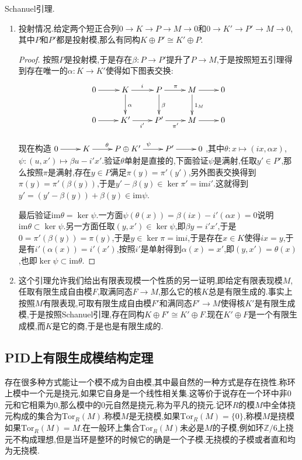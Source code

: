 Schanuel引理.
\begin{enumerate}
	\item 投射情况.给定两个短正合列$0\to K\to P\to M\to0$和$0\to K'\to P'\to M\to0$,其中$P$和$P'$都是投射模,那么有同构$K\oplus P'\cong K'\oplus P$.
	\begin{proof}
		
		按照$P$是投射模,于是存在$\beta:P\to P'$提升了$P\to M$,于是按照短五引理得到存在唯一的$\alpha:K\to K'$使得如下图表交换:
		$$\xymatrix{0\ar[r]&K\ar[r]^i\ar[d]^{\alpha}&P\ar[r]^{\pi}\ar[d]^{\beta}&M\ar[r]\ar[d]^{1_M}&0\\0\ar[r]&K'\ar[r]_{i'}&P'\ar[r]_{\pi'}&M\ar[r]&0}$$
		
		现在构造$\xymatrix{0\ar[r]&K\ar[r]^{\theta}&P\oplus K'\ar[r]^{\psi}&P'\ar[r]&0}$,其中$\theta:x\mapsto(ix,\alpha x)$,$\psi:(u,x')\mapsto\beta u-i'x'$.验证$\theta$单射是直接的,下面验证$\psi$是满射,任取$y'\in P'$,那么按照$\pi$是满射,存在$y\in P$满足$\pi(y)=\pi'(y')$,另外图表交换得到$\pi(y)=\pi'(\beta(y))$,于是$y'-\beta(y)\in\ker\pi'=\mathrm{im}i'$.这就得到$y'=(y'-\beta(y))+\beta(y)\in\mathrm{im}\psi$.
		
		最后验证$\mathrm{im}\theta=\ker\psi$.一方面$\psi(\theta(x))=\beta(ix)-i'(\alpha x)=0$说明$\mathrm{im}\theta\subset\ker\psi$.另一方面任取$(y,x')\in\ker\psi$,即$\beta y=i'x'$,于是$0=\pi'(\beta(y))=\pi(y)$,于是$y\in\ker\pi=\mathrm{im}i$,于是存在$x\in K$使得$ix=y$,于是有$i'(\alpha(x))=i'(x')$,按照$i'$是单射得到$\alpha(x)=x'$,即$(y,x')=\theta(x)$,也即$\ker\psi\subset\mathrm{im}\theta$.
	\end{proof}
	\item 这个引理允许我们给出有限表现模一个性质的另一证明,即给定有限表现模$M$,任取有限生成自由模$F$,取满同态$F\to M$,那么它的核$K$总是有限生成的.事实上按照$M$有限表现,可取有限生成自由模$F'$和满同态$F'\to M$使得核$K'$是有限生成模,于是按照Schanuel引理,存在同构$K\oplus F'\cong K'\oplus F$.现在$K'\oplus F$是一个有限生成模,而$K$是它的商,于是也是有限生成的.
\end{enumerate}

\newpage
\subsection{PID上有限生成模结构定理}

存在很多种方式能让一个模不成为自由模,其中最自然的一种方式是存在挠性.称环上模中一个元是挠元,如果它自身是一个线性相关集.这等价于说存在一个环中非0元和它相乘为0,那么模中的0元自然是挠元,称为平凡的挠元.记环$R$的模$M$中全体挠元构成的集合为$\mathrm{Tor}_R(M)$.称模$M$是无挠模,如果$\mathrm{Tor}_{R}(M)=\{0\}$,称模$M$是挠模如果$\mathrm{Tor}_R(M)=M$.在一般环上集合$\mathrm{Tor}_R(M)$未必是$M$的子模,例如环$\mathbb{Z}/6$上挠元不构成理想,但是当环是整环的时候它的确是一个子模.无挠模的子模或者直和均为无挠模.


